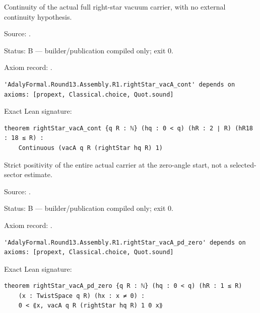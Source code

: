 \begin{theorem}[bp-566]
\label{bp-566}
\uses{}
\leanok
Continuity of the actual full right-star vacuum carrier, with no external continuity hypothesis.

\par Source: \texttt{}.
\par Status: B — builder/publication compiled only; exit 0.
\par Axiom record: \texttt{}.
\begin{verbatim}
'AdalyFormal.Round13.Assembly.R1.rightStar_vacA_cont' depends on axioms: [propext, Classical.choice, Quot.sound]
\end{verbatim}
\par Exact Lean signature:
\begin{verbatim}
theorem rightStar_vacA_cont {q R : ℕ} (hq : 0 < q) (hR : 2 ∣ R) (hR18 : 18 ≤ R) :
    Continuous (vacA q R (rightStar hq R) 1)
\end{verbatim}
\end{theorem}

\begin{theorem}[bp-567]
\label{bp-567}
\leanok
Strict positivity of the entire actual carrier at the zero-angle start, not a selected-sector estimate.

\par Source: \texttt{}.
\par Status: B — builder/publication compiled only; exit 0.
\par Axiom record: \texttt{}.
\begin{verbatim}
'AdalyFormal.Round13.Assembly.R1.rightStar_vacA_pd_zero' depends on axioms: [propext, Classical.choice, Quot.sound]
\end{verbatim}
\par Exact Lean signature:
\begin{verbatim}
theorem rightStar_vacA_pd_zero {q R : ℕ} (hq : 0 < q) (hR : 1 ≤ R)
    (x : TwistSpace q R) (hx : x ≠ 0) :
    0 < ⟪x, vacA q R (rightStar hq R) 1 0 x⟫
\end{verbatim}
\end{theorem}

